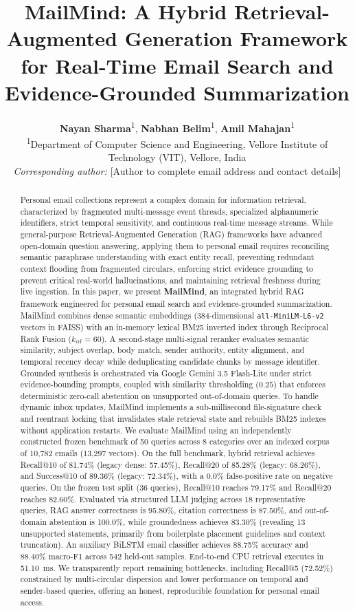\documentclass[11pt,a4paper]{article}
\title{\textbf{MailMind: A Hybrid Retrieval-Augmented Generation Framework for Real-Time Email Search and Evidence-Grounded Summarization}}
\author{
    \textbf{Nayan Sharma}\textsuperscript{1}, 
    \textbf{Nabhan Belim}\textsuperscript{1}, 
    \textbf{Amil Mahajan}\textsuperscript{1} \\
    \small \textsuperscript{1}Department of Computer Science and Engineering, Vellore Institute of Technology (VIT), Vellore, India \\
    \small \textit{Corresponding author:} [Author to complete email address and contact details]
}
\date{}
\begin{document}
\maketitle

\begin{abstract}
Personal email collections represent a complex domain for information retrieval, characterized by fragmented multi-message event threads, specialized alphanumeric identifiers, strict temporal sensitivity, and continuous real-time message streams. While general-purpose Retrieval-Augmented Generation (RAG) frameworks have advanced open-domain question answering, applying them to personal email requires reconciling semantic paraphrase understanding with exact entity recall, preventing redundant context flooding from fragmented circulars, enforcing strict evidence grounding to prevent critical real-world hallucinations, and maintaining retrieval freshness during live ingestion. In this paper, we present \textbf{MailMind}, an integrated hybrid RAG framework engineered for personal email search and evidence-grounded summarization. MailMind combines dense semantic embeddings (384-dimensional \texttt{all-MiniLM-L6-v2} vectors in FAISS) with an in-memory lexical BM25 inverted index through Reciprocal Rank Fusion ($k_{\text{rrf}}=60$). A second-stage multi-signal reranker evaluates semantic similarity, subject overlap, body match, sender authority, entity alignment, and temporal recency decay while deduplicating candidate chunks by message identifier. Grounded synthesis is orchestrated via Google Gemini 3.5 Flash-Lite under strict evidence-bounding prompts, coupled with similarity thresholding ($0.25$) that enforces deterministic zero-call abstention on unsupported out-of-domain queries. To handle dynamic inbox updates, MailMind implements a sub-millisecond file-signature check and reentrant locking that invalidates stale retrieval state and rebuilds BM25 indexes without application restarts. We evaluate MailMind using an independently constructed frozen benchmark of 50 queries across 8 categories over an indexed corpus of 10,782 emails (13,297 vectors). On the full benchmark, hybrid retrieval achieves Recall@10 of 81.74\% (legacy dense: 57.45\%), Recall@20 of 85.28\% (legacy: 68.26\%), and Success@10 of 89.36\% (legacy: 72.34\%), with a 0.0\% false-positive rate on negative queries. On the frozen test split (36 queries), Recall@10 reaches 79.17\% and Recall@20 reaches 82.60\%. Evaluated via structured LLM judging across 18 representative queries, RAG answer correctness is 95.80\%, citation correctness is 87.50\%, and out-of-domain abstention is 100.0\%, while groundedness achieves 83.30\% (revealing 13 unsupported statements, primarily from boilerplate placement guidelines and context truncation). An auxiliary BiLSTM email classifier achieves 88.75\% accuracy and 88.40\% macro-F1 across 542 held-out samples. End-to-end CPU retrieval executes in 51.10~ms. We transparently report remaining bottlenecks, including Recall@5 (72.52\%) constrained by multi-circular dispersion and lower performance on temporal and sender-based queries, offering an honest, reproducible foundation for personal email access.
\end{abstract}
\end{document}
